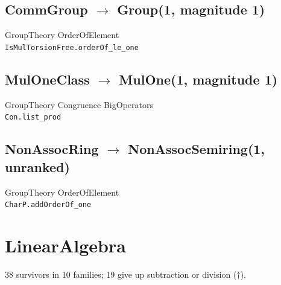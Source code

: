 \documentclass[10pt,a4paper]{article}
\begin{document}
\subsection*{CommGroup $\to$ Group\quad\textmd{\small (1, magnitude 1)}}
{\footnotesize\color{locator}GroupTheory\,\textperiodcentered\,OrderOfElement}\\
\hspace*{1em}\texttt{\small IsMulTorsionFree.\allowbreak{}orderOf\_le\_one}\\

\subsection*{MulOneClass $\to$ MulOne\quad\textmd{\small (1, magnitude 1)}}
{\footnotesize\color{locator}GroupTheory\,\textperiodcentered\,Congruence\,\textperiodcentered\,BigOperators}\\
\hspace*{1em}\texttt{\small Con.\allowbreak{}list\_prod}\\

\subsection*{NonAssocRing $\to$ NonAssocSemiring\quad\textmd{\small (1, unranked)}}
{\footnotesize\color{locator}GroupTheory\,\textperiodcentered\,OrderOfElement}\\
\hspace*{1em}\texttt{\small CharP.\allowbreak{}addOrderOf\_one}\\

\clearpage
\section{LinearAlgebra}
38 survivors in 10 families; 19 give up subtraction or division ($\dagger$).
\end{document}
